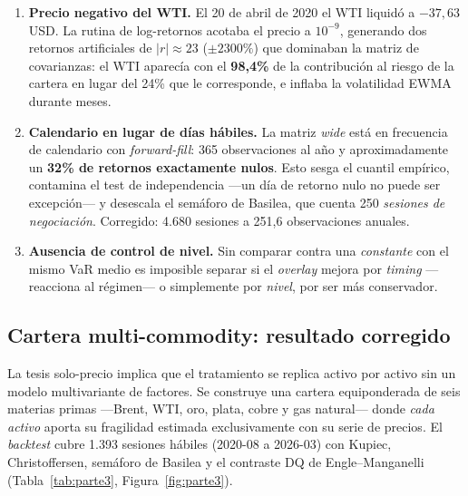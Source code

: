 \documentclass[11pt,a4paper]{article}
\begin{document}
\begin{enumerate}
  \item \textbf{Precio negativo del WTI.} El 20 de abril de 2020 el WTI liquidó a
    $-37{,}63$ USD. La rutina de log-retornos acotaba el precio a $10^{-9}$,
    generando dos retornos artificiales de $|r|\approx 23$ ($\pm2300\%$) que
    dominaban la matriz de covarianzas: el WTI aparecía con el \textbf{98{,}4\%}
    de la contribución al riesgo de la cartera en lugar del 24\% que le
    corresponde, e inflaba la volatilidad EWMA durante meses.
  \item \textbf{Calendario en lugar de días hábiles.} La matriz \emph{wide} está
    en frecuencia de calendario con \emph{forward-fill}: 365 observaciones al año
    y aproximadamente un \textbf{32\% de retornos exactamente nulos}. Esto sesga
    el cuantil empírico, contamina el test de independencia —un día de retorno
    nulo no puede ser excepción— y desescala el semáforo de Basilea, que cuenta
    250 \emph{sesiones de negociación}. Corregido: 4.680 sesiones a 251{,}6
    observaciones anuales.
  \item \textbf{Ausencia de control de nivel.} Sin comparar contra una
    \emph{constante} con el mismo VaR medio es imposible separar si el
    \emph{overlay} mejora por \emph{timing} —reacciona al régimen— o simplemente
    por \emph{nivel}, por ser más conservador.
\end{enumerate}

\subsection{Cartera multi-commodity: resultado corregido}
La tesis solo-precio implica que el tratamiento se replica activo por activo sin
un modelo multivariante de factores. Se construye una cartera equiponderada de
seis materias primas —Brent, WTI, oro, plata, cobre y gas natural— donde
\emph{cada activo} aporta su fragilidad estimada exclusivamente con su serie de
precios. El \emph{backtest} cubre 1.393 sesiones hábiles (2020-08 a 2026-03) con
Kupiec, Christoffersen, semáforo de Basilea y el contraste DQ de
Engle--Manganelli (Tabla~\ref{tab:parte3}, Figura~\ref{fig:parte3}).
\end{document}
